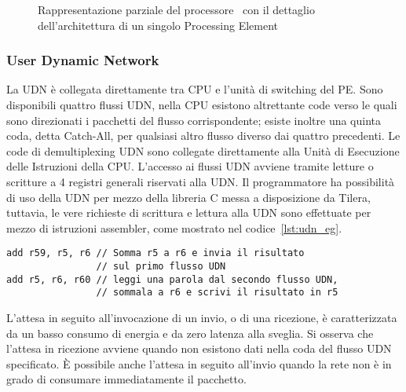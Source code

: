 \begin{figure}[!t]
  \begin{subfigure}[b]{.5\textwidth}
    \centering
    \label{fig:iMesh}
  \end{subfigure}
  \hspace{1ex}
  \begin{subfigure}[b]{.5\textwidth}
    \centering
    \label{fig:iMesh_tile}
  \end{subfigure}     
  \caption[Schema del processore Tilera \tile]{Rappresentazione parziale del processore \tile\ con il dettaglio dell'architettura di un singolo Processing Element}
  \label{fig:tilera}
\end{figure}

\subsubsection{User Dynamic Network}
\label{sct:intro_arch_udn}
La UDN \`e collegata direttamente tra CPU e l'unit\`a di switching del PE. Sono disponibili quattro flussi UDN, nella CPU esistono altrettante code verso le quali sono direzionati i pacchetti del flusso corrispondente; esiste inoltre una quinta coda, detta Catch-All, per qualsiasi altro flusso diverso dai quattro precedenti. Le code di demultiplexing UDN sono collegate direttamente alla Unit\`a di Esecuzione delle Istruzioni della CPU. L'accesso ai flussi UDN avviene tramite letture o scritture a 4 registri generali riservati alla UDN. Il programmatore ha possibilit\`a di uso della UDN per mezzo della libreria C messa a disposizione da Tilera, tuttavia, le vere richieste di scrittura e lettura alla UDN sono effettuate per mezzo di istruzioni assembler, come mostrato nel codice~\ref{lst:udn_eg}.
\begin{lstlisting}[float = b, basicstyle = {\small \ttfamily}, commentstyle={\rmfamily \itshape \footnotesize}, caption = {Istruzioni assembler per accedere alla UDN}, label = {lst:udn_eg}]
add r59, r5, r6 // Somma r5 a r6 e invia il risultato 
                // sul primo flusso UDN
add r5, r6, r60 // leggi una parola dal secondo flusso UDN,
                // sommala a r6 e scrivi il risultato in r5
\end{lstlisting}
L'attesa in seguito all'invocazione di un invio, o di una ricezione, \`e caratterizzata da un basso consumo di energia e da zero latenza alla sveglia. Si osserva che l'attesa in ricezione avviene quando non esistono dati nella coda del flusso UDN specificato. \`E possibile anche l'attesa in seguito all'invio quando la rete non \`e in grado di consumare immediatamente il pacchetto.

